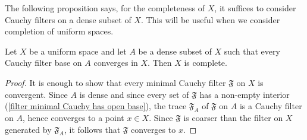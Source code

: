 The following proposition says, for the completeness of $X$, it suffices to consider Cauchy filters on a dense subset of $X$. This will be useful when we consider completion of uniform spaces.
\begin{proposition}\label{complete space iff Cauchy filter on dense subset}
Let $X$ be a uniform space and let $A$ be a dense subset of $X$ such that every Cauchy filter base on $A$ converges in $X$. Then $X$ is complete.
\end{proposition}
\begin{proof}
It is enough to show that every minimal Cauchy filter $\mathfrak{F}$ on $X$ is convergent. Since $A$ is dense and since every set of $\mathfrak{F}$ has a non-empty interior (\cref{filter minimal Cauchy has open base}), the trace $\mathfrak{F}_A$ of $\mathfrak{F}$ on $A$ is a Cauchy filter on $A$, hence converges to a point $x\in X$. Since $\mathfrak{F}$ is coarser than the filter on $X$ generated by $\mathfrak{F}_A$, it follows that $\mathfrak{F}$ converges to $x$.
\end{proof}
